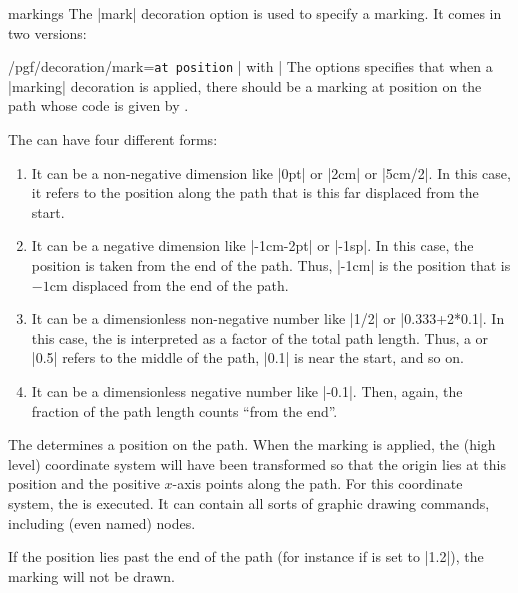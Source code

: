 \begin{decoration}{markings}
    The |mark| decoration option is used to specify a marking. It comes in two
    versions:
    \begin{key}{/pgf/decoration/mark=\texttt{at position} | with |}
        The options specifies that when a |marking| decoration is applied,
        there should be a marking at position  on the path whose code
        is given by .

        The  can have four different forms:
        \begin{enumerate}
            \item It can be a non-negative dimension like |0pt| or |2cm| or
                |5cm/2|. In this case, it refers to the position along the path
                that is this far displaced from the start.
            \item It can be a negative dimension like |-1cm-2pt| or |-1sp|. In
                this case, the position is taken from the end of the path.
                Thus, |-1cm| is the position that is $-1$cm displaced from the
                end of the path.
            \item It can be a dimensionless non-negative number like |1/2| or
                |0.333+2*0.1|. In this case, the  is interpreted as a
                factor of the total path length. Thus, a  or |0.5|
                refers to the middle of the path, |0.1| is near the start, and
                so on.
            \item It can be a dimensionless negative number like |-0.1|. Then,
                again, the fraction of the path length counts ``from the end''.
        \end{enumerate}

        The  determines a position on the path. When the marking is
        applied, the (high level) coordinate system will have been transformed
        so that the origin lies at this position and the positive $x$-axis
        points along the path. For this coordinate system, the  is
        executed. It can contain all sorts of graphic drawing commands,
        including (even named) nodes.

        If the position lies past the end of the path (for instance if
         is set to |1.2|), the marking will not be drawn.


\end{key}
\end{decoration}
